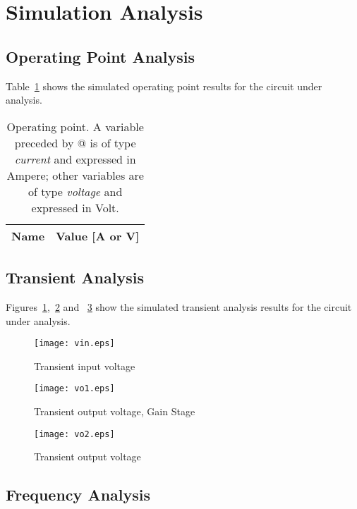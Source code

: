 \section{Simulation Analysis}
\label{sec:simulation}

\subsection{Operating Point Analysis}


Table~\ref{tab:op} shows the simulated operating point results for the circuit
under analysis.

\begin{table}[h]
  \centering
  \begin{tabular}{|l|r|}
    \hline
    {\bf Name} & {\bf Value [A or V]} \\ \hline
    
  \end{tabular}
  \caption{Operating point. A variable preceded by @ is of type {\em current}
    and expressed in Ampere; other variables are of type {\it voltage} and expressed in
    Volt.}
  \label{tab:op}
\end{table}



\subsection{Transient Analysis}

Figures~\ref{fig:transvin},~\ref{fig:transvo1} and ~\ref{fig:transvo2} show the simulated transient analysis results for the circuit under analysis.

\begin{figure}[h] \centering
\texttt{[image: vin.eps]}
\caption{Transient input voltage}
\label{fig:transvin}
\end{figure}

\begin{figure}[h] \centering
\texttt{[image: vo1.eps]}
\caption{Transient output voltage, Gain Stage}
\label{fig:transvo1}
\end{figure}

\begin{figure}[h] \centering
\texttt{[image: vo2.eps]}
\caption{Transient output voltage}
\label{fig:transvo2}
\end{figure}


\subsection{Frequency Analysis}

